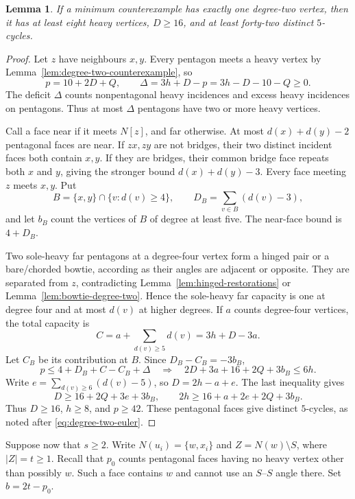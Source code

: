 \documentclass[11pt]{article}
\newtheorem{lemma}[theorem]{Lemma}
\theoremstyle{remark}
\numberwithin{equation}{section}
\numberwithin{table}{section}
\begin{document}
\begin{lemma}\label{lem:unique-degree-two-heavy-budget}
If a minimum counterexample has exactly one degree-two vertex, then it
has at least eight heavy vertices, $D\ge16$, and at least forty-two
distinct $5$-cycles.
\end{lemma}
\begin{proof}
Let $z$ have neighbours $x,y$. Every pentagon meets a heavy vertex by
Lemma~\ref{lem:degree-two-counterexample}, so
\[
 p=10+2D+Q,\qquad \Delta=3h+D-p=3h-D-10-Q\ge0.
\]
The deficit $\Delta$ counts nonpentagonal heavy incidences and excess
heavy incidences on pentagons. Thus at most $\Delta$ pentagons have
two or more heavy vertices.

Call a face near if it meets $N[z]$, and far otherwise. At most
$d(x)+d(y)-2$ pentagonal faces are near. If $zx,zy$ are not bridges,
their two distinct incident faces both contain $x,y$. If they are
bridges, their common bridge face repeats both $x$ and $y$, giving
the stronger bound $d(x)+d(y)-3$. Every face meeting $z$ meets $x,y$.
Put
\[
 B=\{x,y\}\cap\{v:d(v)\ge4\},\qquad
 D_B=\sum_{v\in B}(d(v)-3),
\]
and let $b_B$ count the vertices of $B$ of degree at least five.
The near-face bound is $4+D_B$.

Two sole-heavy far pentagons at a degree-four vertex form a hinged
pair or a bare/chorded bowtie, according as their angles are adjacent
or opposite. They are separated from $z$, contradicting
Lemma~\ref{lem:hinged-restorations} or
Lemma~\ref{lem:bowtie-degree-two}. Hence the sole-heavy far capacity
is one at degree four and at most $d(v)$ at higher degrees. If $a$
counts degree-four vertices, the total capacity is
\[
 C=a+\sum_{d(v)\ge5}d(v)=3h+D-3a.
\]
Let $C_B$ be its contribution at $B$. Since $D_B-C_B=-3b_B$,
\[
 p\le4+D_B+C-C_B+\Delta
 \quad\Longrightarrow\quad
 2D+3a+16+2Q+3b_B\le6h.
\]
Write $e=\sum_{d(v)\ge6}(d(v)-5)$, so $D=2h-a+e$. The last
inequality gives
\[
 D\ge16+2Q+3e+3b_B,\qquad
 2h\ge16+a+2e+2Q+3b_B.
\]
Thus $D\ge16$, $h\ge8$, and $p\ge42$. These pentagonal faces give
distinct $5$-cycles, as noted after \eqref{eq:degree-two-euler}.
\end{proof}

Suppose now that $s\ge2$. Write $N(u_i)=\{w,x_i\}$ and
$Z=N(w)\setminus S$, where $|Z|=t\ge1$. Recall that $p_0$ counts
pentagonal faces having no heavy vertex other than possibly $w$.
Such a face contains $w$ and cannot use an $S$--$S$ angle there.
Set $b=2t-p_0$.
\end{document}
